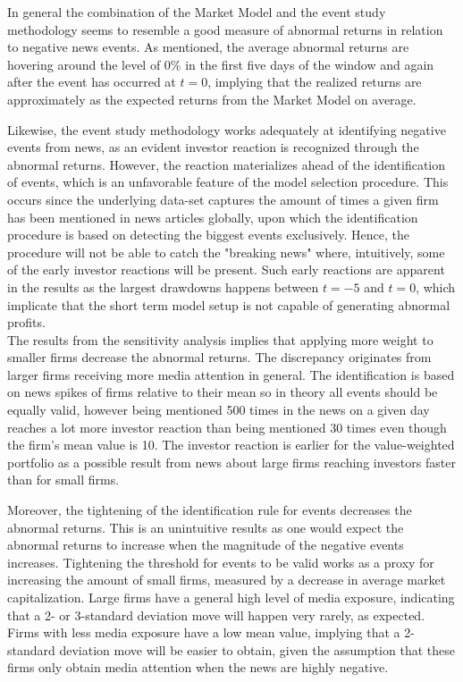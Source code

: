 In general the combination of the Market Model and the event study methodology seems to resemble a good measure of abnormal returns in relation to negative news events. As mentioned, the average abnormal returns are hovering around the level of 0\% in the first five days of the window and again after the event has occurred at $t = 0$, implying that the realized returns are approximately as the expected returns from the Market Model on average. 

Likewise, the event study methodology works adequately at identifying negative events from news, as an evident investor reaction is recognized through the abnormal returns. However, the reaction materializes ahead of the identification of events, which is an unfavorable feature of the model selection procedure. This occurs since the underlying data-set captures the amount of times a given firm has been mentioned in news articles globally, upon which the identification procedure is based on detecting the biggest events exclusively. Hence, the procedure will not be able to catch the "breaking news" where, intuitively, some of the early investor reactions will be present. Such early reactions are apparent in the results as the largest drawdowns happens between $t = -5$ and $t = 0$, which implicate that the short term model setup is not capable of generating abnormal profits.  \\
The results from the sensitivity analysis implies that applying more weight to smaller firms decrease the abnormal returns. The discrepancy originates from larger firms receiving more media attention in general. The identification is based on news spikes of firms relative to their mean so in theory all events should be equally valid, however being mentioned 500 times in the news on a given day reaches a lot more investor reaction than being mentioned 30 times even though the firm's mean value is 10. The investor reaction is earlier for the value-weighted portfolio as a possible result from news about large firms reaching investors faster than for small firms. 

Moreover, the tightening of the identification rule for events decreases the abnormal returns. This is an unintuitive results as one would expect the abnormal returns to increase when the magnitude of the negative events increases. Tightening the threshold for events to be valid works as a proxy for increasing the amount of small firms, measured by a decrease in average market capitalization. Large firms have a general high level of media exposure, indicating that a 2- or 3-standard deviation move will happen very rarely, as expected. Firms with less media exposure have a low mean value, implying that a 2-standard deviation move will be easier to obtain, given the assumption that these firms only obtain media attention when the news are highly negative. 

